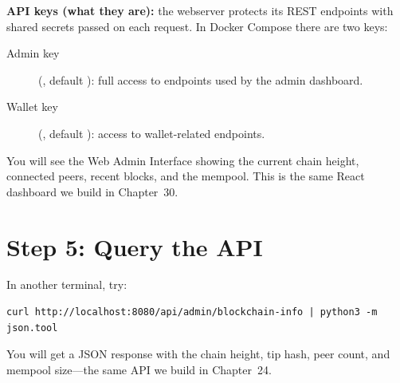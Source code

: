 \begin{notebox}
\textbf{API keys (what they are):} the webserver protects its REST endpoints
with shared secrets passed on each request. In Docker Compose there are two keys:

\begin{description}
  \item[Admin key] (, default ):
    full access to  endpoints used by the admin dashboard.
  \item[Wallet key] (, default ):
    access to wallet-related endpoints.
\end{description}
\end{notebox}

You will see the Web Admin Interface showing the current chain height, connected peers, recent
blocks, and the mempool. This is the same React dashboard we build in Chapter~30.

\section{Step 5: Query the API}
\label{sec:step5-query}

In another terminal, try:

\begin{verbatim}
curl http://localhost:8080/api/admin/blockchain-info | python3 -m json.tool
\end{verbatim}

You will get a JSON response with the chain height, tip hash, peer count, and mempool size---the
same API we build in Chapter~24.

